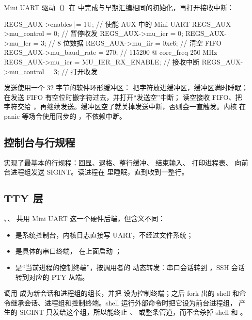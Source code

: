 Mini UART 驱动（）在  中完成与早期汇编相同的初始化，再打开接收中断：

\begin{ccode}
REGS_AUX->enables |= 1U;               // 使能 AUX 中的 Mini UART
REGS_AUX->mu_control = 0;              // 暂停收发
REGS_AUX->mu_ier = 0;
REGS_AUX->mu_lcr = 3;                  // 8 位数据
REGS_AUX->mu_iir = 0xc6;               // 清空 FIFO
REGS_AUX->mu_baud_rate = 270;          // 115200 @ core_freq 250 MHz
REGS_AUX->mu_ier = MU_IER_RX_ENABLE;   // 接收中断
REGS_AUX->mu_control = 3;              // 打开收发
\end{ccode}

发送使用一个 32 字节的软件环形缓冲区： 把字符放进缓冲区，缓冲区满时睡眠； 在发送 FIFO 有空位时搬字符过去，并打开“发送空”中断； 读空接收 FIFO、把字符交给 ，再继续发送。缓冲区空了就关掉发送中断，否则会一直触发。内核  在 panic 等场合使用同步的 ，不依赖中断。

\subsection{控制台与行规程}

 实现了最基本的行规程：回显、退格、整行缓冲、 结束输入、 打印进程表、 向前台进程组发送 SIGINT。读进程在  里睡眠，直到收到一整行。

\subsection{TTY 层}

、、 共用 Mini UART 这一个硬件后端，但含义不同：

\begin{itemize}
  \item {} 是系统控制台，内核日志直接写 UART，不经过文件系统；
  \item {} 是具体的串口终端， 在上面启动 ；
  \item {} 是“当前进程的控制终端”，按调用者的  动态转发：串口会话转到 ，SSH 会话转到对应的 PTY 从端。
\end{itemize}

 调用  成为新会话和进程组的组长，并把  设为控制终端；之后 fork 出的 shell 和命令继承会话、进程组和控制终端。shell 运行外部命令时把它设为前台进程组， 产生的 SIGINT 只发给这个组，所以能终止 、 或整条管道，而不会杀掉 shell 和 。

